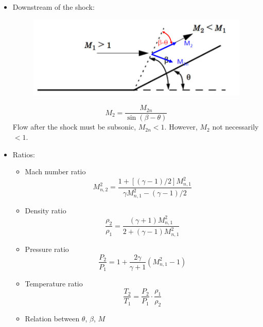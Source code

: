 \begin{itemize}
    \item {\color{red}Downstream of the shock:}
    \begin{figure}[H]
        \centering
        \includegraphics[width=1.0\linewidth]{images/oblique_shocks_downstream.png}
    \end{figure}
    \begin{equation*}
        M_2 = \frac{M_{2n}}{\sin(\beta - \theta)}
    \end{equation*}
    Flow after the shock must be subsonic, $M_{2n}<1$. However, {\color{blue}$M_2$ not necessarily $< 1$}.
    \item Ratios:
    \begin{itemize}
        \item Mach number ratio
        \begin{equation*}
            M_{n,2}^2 = \frac{1+[(\gamma - 1)/2]M_{n,1}^2}{\gamma M_{n,1}^2-(\gamma - 1)/2}
        \end{equation*}
        \item Density ratio
        \begin{equation*}
            \frac{\rho_2}{\rho_1} = \frac{(\gamma+1)M_{n,1}^2}{2+(\gamma-1)M_{n,1}^2}
        \end{equation*}
        \item Pressure ratio
        \begin{equation*}
            \frac{P_2}{P_1} = 1+ \frac{2\gamma}{\gamma + 1}(M_{n,1}^2 - 1)
        \end{equation*}
        \item Temperature ratio
        \begin{equation*}
            \frac{T_2}{T_1} = \frac{P_2}{P_1} \cdot \frac{\rho_1}{\rho_2}
        \end{equation*}
        \item Relation between $\theta$, $\beta$, $M$
        \begin{figure}[H]
            \centering

\end{figure}
\end{itemize}
\end{itemize}
